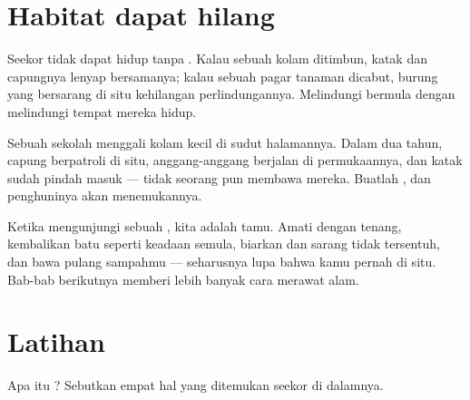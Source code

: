 \section{Habitat dapat hilang}

\begin{proposition}\label{prop:g2:where-animals-live:loss}
Seekor  tidak dapat hidup tanpa . Kalau sebuah kolam
ditimbun, katak dan capungnya lenyap bersamanya; kalau sebuah pagar
tanaman dicabut, burung yang bersarang di situ kehilangan
perlindungannya. Melindungi  bermula dengan melindungi tempat
mereka hidup.
\end{proposition}
\admitted

\begin{example}\label{ex:g2:where-animals-live:schoolpond}
Sebuah sekolah menggali kolam kecil di sudut halamannya. Dalam dua
tahun, capung berpatroli di situ, anggang-anggang berjalan di
permukaannya, dan katak sudah pindah masuk --- tidak seorang pun
membawa mereka. Buatlah , dan penghuninya akan menemukannya.
\end{example}

\begin{remark}\label{rem:g2:where-animals-live:respect}
Ketika mengunjungi sebuah , kita adalah tamu. Amati dengan
tenang, kembalikan batu seperti keadaan semula, biarkan  dan
sarang tidak tersentuh, dan bawa pulang sampahmu --- 
seharusnya lupa bahwa kamu pernah di situ. Bab-bab berikutnya memberi
lebih banyak cara merawat alam.
\end{remark}

\section{Latihan}

\begin{exercise}[$\star$]\label{exo:g2:where-animals-live:1}
Apa itu ? Sebutkan empat hal yang ditemukan seekor  di
dalamnya.
\end{exercise}

